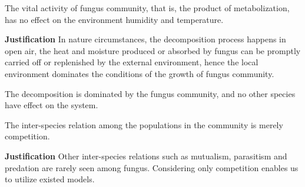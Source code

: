 \begin{definition}
    The vital activity of fungus community, that is, the product of metabolization, has no effect on the environment humidity and temperature.

    \textbf{Justification} In nature circumstances, the decomposition process happens in open air, the heat and moisture produced or absorbed by fungus can be promptly carried off or replenished  by the external environment, hence the local environment dominates the conditions of the growth of fungus community.
\end{definition}

\begin{definition}
    The decomposition is dominated by the fungus community, and no other species have effect on the system.
\end{definition}

\begin{definition}
    The inter-species relation among the populations in the community is merely competition.

    \textbf{Justification} Other inter-species relations such as mutualism, parasitism and predation are rarely seen among fungus. Considering only competition enables us to utilize existed models.
\end{definition}




